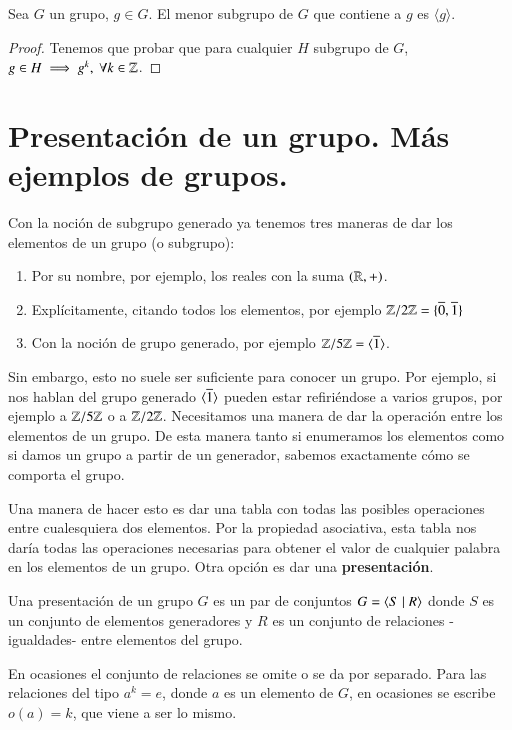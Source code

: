 \begin{thm}
	Sea $G$ un grupo, $g \in G$. El menor subgrupo de $G$ que contiene a $g$ es $\langle g \rangle$.
\end{thm}

\begin{proof}
	Tenemos que probar que para cualquier $H$ subgrupo de $G$, $g \in H \implies g^k,\ \forall k \in \mathbb{Z}$.
\end{proof}

\section{Presentación de un grupo. Más ejemplos de grupos.}

Con la noción de subgrupo generado ya tenemos tres maneras de dar los elementos de un grupo (o subgrupo):
\begin{enumerate}
	\item Por su nombre, por ejemplo, los reales con la suma $(\mathbb{R}, +)$.
	\item Explícitamente, citando todos los elementos, por ejemplo $\mathbb{Z}/2\mathbb{Z} = \{\overline{0}, \overline{1}\}$
	\item Con la noción de grupo generado, por ejemplo $\mathbb{Z}/5\mathbb{Z} = \langle\overline{1}\rangle$.
\end{enumerate}

Sin embargo, esto no suele ser suficiente para conocer un grupo. Por ejemplo, si nos hablan del grupo generado $\langle\overline{1}\rangle$ pueden estar refiriéndose a varios grupos, por ejemplo a $\mathbb{Z}/5\mathbb{Z}$ o a $\mathbb{Z}/2\mathbb{Z}$. Necesitamos una manera de dar la operación entre los elementos de un grupo. De esta manera tanto si enumeramos los elementos como si damos un grupo a partir de un generador, sabemos exactamente cómo se comporta el grupo.

Una manera de hacer esto es dar una tabla con todas las posibles operaciones entre cualesquiera dos elementos. Por la propiedad asociativa, esta tabla nos daría todas las operaciones necesarias para obtener el valor de cualquier palabra en los elementos de un grupo. Otra opción es dar una \textbf{presentación}.

\begin{dfn}
	Una presentación de un grupo $G$ es un par de conjuntos $G = \langle S \mid R\rangle$ donde $S$ es un conjunto de elementos generadores y $R$ es un conjunto de relaciones -igualdades- entre elementos del grupo.
\end{dfn}

En ocasiones el conjunto de relaciones se omite o se da por separado. Para las relaciones del tipo $a^k = e$, donde $a$ es un elemento de $G$, en ocasiones se escribe $o(a) = k$, que viene a ser lo mismo.

